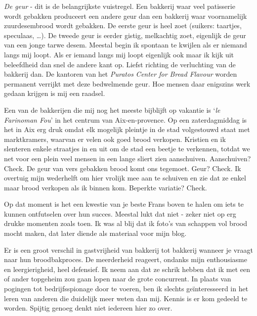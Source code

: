 \documentclass[
  11pt,
  dutch,
]{memoir}
\begin{document}
\begin{enumerate}
  \emph{De geur} - dit is de belangrijkste vuistregel. Een bakkerij waar
  veel patisserie wordt gebakken produceert een andere geur dan een
  bakkerij waar voornamelijk zuurdesembrood wordt gebakken. De eerste
  geur is heel zoet (suikers: taartjes, speculaas, \ldots). De tweede
  geur is eerder gistig, melkachtig zoet, eigenlijk de geur van een
  jonge tarwe desem. Meestal begin ik spontaan te kwijlen als er niemand
  langs mij loopt. Als er iemand langs mij loopt eigenlijk ook maar ik
  kijk uit beleefdheid dan snel de andere kant op. Liefst richting de
  verluchting van de bakkerij dan. \newline De kantoren van het
  \emph{Puratos Center for Bread Flavour} worden permanent verrijkt met
  deze bedwelmende geur. Hoe mensen daar enigszins werk gedaan krijgen
  is mij een raadsel.
\end{enumerate}

Een van de bakkerijen die mij nog het meeste bijblijft op vakantie is
`\emph{le Farinoman Fou}' in het centrum van Aix-en-provence. Op een
zaterdagmiddag is het in Aix erg druk omdat elk mogelijk pleintje in de
stad volgestouwd staat met marktkramers, waarvan er velen ook goed brood
verkopen. Kristien en ik slenteren enkele straatjes in en uit om de stad
een beetje te verkennen, totdat we net voor een plein veel mensen in een
lange sliert zien aanschuiven. Aanschuiven? Check. De geur van vers
gebakken brood komt ons tegemoet. Geur? Check. Ik overtuig mijn
wederhelft om hier vrolijk mee aan te schuiven en zie dat ze enkel maar
brood verkopen als ik binnen kom. Beperkte variatie? Check.

Op dat moment is het een kwestie van je beste Frans boven te halen om
iets te kunnen ontfutselen over hun succes. Meestal lukt dat niet -
zeker niet op erg drukke momenten zoals toen. Ik was al blij dat ik
foto's van schappen vol brood mocht maken, dat later diende als
materiaal voor mijn blog.

Er is een groot verschil in gastvrijheid van bakkerij tot bakkerij
wanneer je vraagt naar hun broodbakproces. De meerderheid reageert,
ondanks mijn enthousiasme en leergierigheid, heel defensief. Ik neem aan
dat ze schrik hebben dat ik met een of ander topgeheim zou gaan lopen
naar de grote concurrent. In plaats van pogingen tot bedrijfsspionage
door te voeren, ben ik slechts geïnteresseerd in het leren van anderen
die duidelijk meer weten dan mij. Kennis is er kom gedeeld te worden.
Spijtig genoeg denkt niet iedereen hier zo over.
\end{document}
